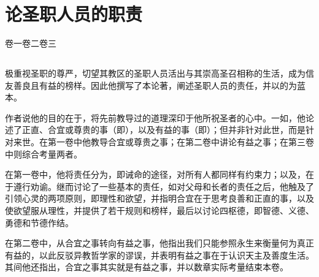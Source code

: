 
\chapter{论圣职人员的职责}


卷一\newline{}卷二\newline{}卷三\par



\section{}

极重视圣职的尊严，切望其教区的圣职人员活出与其崇高圣召相称的生活，成为信友善良且有益的榜样。因此他撰写了本论著，阐述圣职人员的责任，并以的为蓝本。\par

作者说他的目的在于，将先前教导过的道理深印于他所祝圣者的心中。一如，他论述了正直、合宜或尊贵的事（即），以及有益的事（即）；但并非针对此世，而是针对来世。在第一卷中他教导合宜或尊贵之事；在第二卷中讲论有益之事；在第三卷中则综合考量两者。\par

在第一卷中，他将责任分为，即诫命的途径，对所有人都同样有约束力；以及，在于遵行劝谕。继而讨论了一些基本的责任，如对父母和长者的责任之后，他触及了引领心灵的两项原则，即理性和欲望，并指明合宜在于思考良善和正直的事，以及使欲望服从理性，并提供了若干规则和榜样，最后以讨论四枢德，即智德、义德、勇德和节德作结。\par

在第二卷中，从合宜之事转向有益之事，他指出我们只能参照永生来衡量何为真正有益的，以此反驳异教哲学家的谬误，并表明有益之事在于认识天主及善度生活。其间他还指出，合宜之事其实就是有益之事，并以数章实际考量结束本卷。\par

